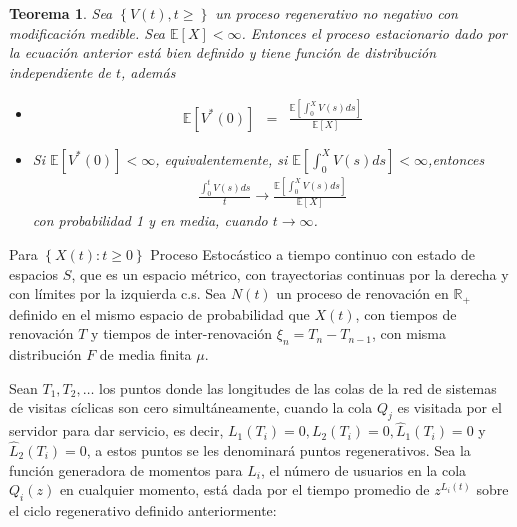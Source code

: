 \documentclass{article}
\newtheorem{Teo}{Teorema}
\newcommand{\rea}{\mathbb{R}}
\newcommand{\esp}{\mathbb{E}}
\begin{document}
\begin{Teo}
Sea $\left\{V\left(t\right),t\geq\right\}$ un proceso regenerativo no negativo con modificaci\'on medible. Sea $\esp\left[X\right]<\infty$. Entonces el proceso estacionario dado por la ecuaci\'on anterior est\'a bien definido y tiene funci\'on de distribuci\'on independiente de $t$, adem\'as
\begin{itemize}
\item[i)] \begin{eqnarray*}
\esp\left[V^{*}\left(0\right)\right]&=&\frac{\esp\left[\int_{0}^{X}V\left(s\right)ds\right]}{\esp\left[X\right]}\end{eqnarray*}
\item[ii)] Si $\esp\left[V^{*}\left(0\right)\right]<\infty$, equivalentemente, si $\esp\left[\int_{0}^{X}V\left(s\right)ds\right]<\infty$,entonces
\begin{eqnarray*}
\frac{\int_{0}^{t}V\left(s\right)ds}{t}\rightarrow\frac{\esp\left[\int_{0}^{X}V\left(s\right)ds\right]}{\esp\left[X\right]}
\end{eqnarray*}
con probabilidad 1 y en media, cuando $t\rightarrow\infty$.
\end{itemize}
\end{Teo}

Para $\left\{X\left(t\right):t\geq0\right\}$ Proceso Estoc\'astico a tiempo continuo con estado de espacios $S$, que es un espacio m\'etrico, con trayectorias continuas por la derecha y con l\'imites por la izquierda c.s. Sea $N\left(t\right)$ un proceso de renovaci\'on en $\rea_{+}$ definido en el mismo espacio de probabilidad que $X\left(t\right)$, con tiempos de renovaci\'on $T$ y tiempos de inter-renovaci\'on $\xi_{n}=T_{n}-T_{n-1}$, con misma distribuci\'on $F$ de media finita $\mu$.




Sean $T_{1},T_{2},\ldots$ los puntos donde las longitudes de las colas de la red de sistemas de visitas c\'iclicas son cero simult\'aneamente, cuando la cola $Q_{j}$ es visitada por el servidor para dar servicio, es decir, $L_{1}\left(T_{i}\right)=0,L_{2}\left(T_{i}\right)=0,\hat{L}_{1}\left(T_{i}\right)=0$ y $\hat{L}_{2}\left(T_{i}\right)=0$, a estos puntos se les denominar\'a puntos regenerativos. Sea la funci\'on generadora de momentos para $L_{i}$, el n\'umero de usuarios en la cola $Q_{i}\left(z\right)$ en cualquier momento, est\'a dada por el tiempo promedio de $z^{L_{i}\left(t\right)}$ sobre el ciclo regenerativo definido anteriormente:
\end{document}
